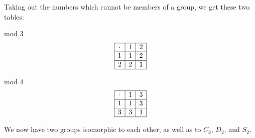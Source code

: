 \documentclass[../gatm.tex]{subfiles}
\begin{document}
Taking out the numbers which cannot be members of a group, we get these two tables:

\vspace{1ex}
\begin{minipage}{0.5\textwidth}
\centering
mod $3$
$$\begin{array}{|c|c|c|}
\hline
\cdot & 1 & 2 \\ \hline
1 & 1 & 2 \\ \hline
2 & 2 & 1 \\ \hline
\end{array}$$
\end{minipage}\hfill
\begin{minipage}{0.5\textwidth}
\centering
mod $4$
$$\begin{array}{|c|c|c|}
\hline
\cdot & 1 & 3 \\ \hline
1 & 1 & 3 \\ \hline
3 & 3 & 1 \\ \hline
\end{array}$$
\end{minipage}
\vspace{1ex}

We now have two groups isomorphic to each other, as well as to $C_2$, $D_2$, and $S_2$.
\end{document}
